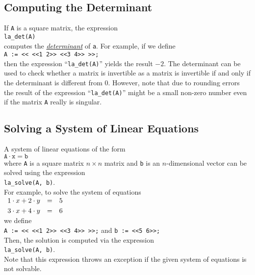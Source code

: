 \subsection{Computing the Determinant}
If \texttt{A} is a square matrix, the expression 
\\[0.2cm]
\hspace*{1.3cm}
\texttt{la\_det(A)}
\\[0.2cm]
computes the \href{http://en.wikipedia.org/wiki/Determinant}{\emph{determinant}} of \texttt{a}.
For example, if we define 
\\[0.2cm]
\hspace*{1.3cm}
\texttt{A := << <<1 2>> <<3 4>> >>;}
\\[0.2cm]
then the expression ``\texttt{la\_det(A)}'' yields the result $-2$.  The determinant can be used to
check whether a matrix is invertible as a matrix is invertible if and only if the determinant
is different from $0$.  However, note that due to rounding errors the result of the expression 
``\texttt{la\_det(A)}''  might be a small non-zero number even if the matrix \texttt{A} really is
singular. 

\subsection{Solving a System of Linear Equations}
A system of linear equations of the form
\\[0.2cm]
\hspace*{1.3cm}
$\texttt{A} \cdot \texttt{x} = \texttt{b}$
\\[0.2cm]
where \texttt{A} is a square matrix $n \times n$  matrix and  \texttt{b} is an $n$-dimensional
vector can be solved using the expression
\\[0.2cm]
\hspace*{1.3cm}
\texttt{la\_solve(A, b)}.
\\[0.2cm]
For example, to solve the system of equations
\\[0.2cm]
\hspace*{1.3cm}
$
\begin{array}[c]{lcl}
  1 \cdot x + 2 \cdot y & = & 5 \\[0.1cm]
  3 \cdot x + 4 \cdot y & = & 6 
\end{array}
$
\\[0.2cm]
we define
\\[0.2cm]
\hspace*{1.3cm}
\texttt{A := << <<1 2>> <<3 4>> >>;} \quad and \quad \texttt{b := <<5 6>>;}
\\[0.2cm]
Then, the solution is computed via the expression
\\[0.2cm]
\hspace*{1.3cm}
\texttt{la\_solve(A, b)}.
\\[0.2cm]
Note that this expression throws an exception if the given system of equations is not solvable.

